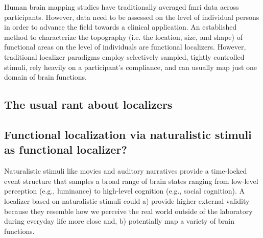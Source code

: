 




Human brain mapping studies have traditionally averaged \ac{fmri} data across
participants.
%
However, data need to be assessed on the level of individual persons in order to
advance the field towards a clinical application.
An established method to characterize the topography (i.e. the location, size,
and shape) of functional areas on the level of individuals are functional
localizers.
However, traditional localizer paradigms employ selectively sampled, tightly
controlled stimuli, rely heavily on a participant's compliance, and can usually
map just one domain of brain functions.


\subsection{The usual rant about localizers}



\subsection{Functional localization via naturalistic stimuli as functional localizer?}



Naturalistic stimuli like movies and auditory narratives \citep[cf.][for
reviews]{jaaskelainen2021movies, jaaskelainen2020neural} provide a time-locked
event structure that samples a broad range of brain states ranging from
low-level perception (e.g., luminance) to high-level cognition (e.g., social
cognition).
%
A localizer based on naturalistic stimuli could
%
a) provide higher external validity because they resemble how we perceive the
real world outside of the laboratory during everyday life more close and,
%
b) potentially map a variety of brain functions.

